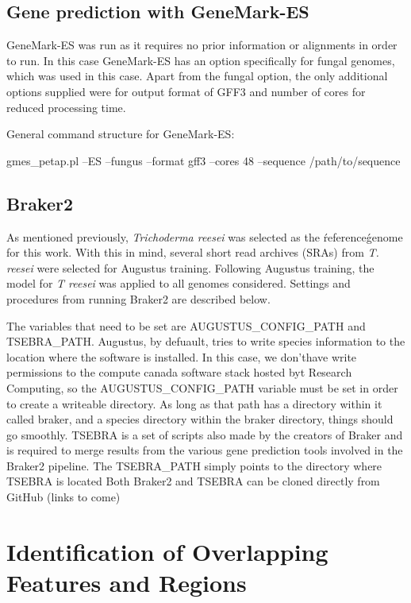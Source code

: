 \subsection{Gene prediction with GeneMark-ES}

GeneMark-ES was run as it requires no prior information or alignments
in order to run. In this case GeneMark-ES has an option specifically
for fungal genomes, which was used in this case. Apart from the fungal
option, the only additional options supplied were for output format of
GFF3 and number of cores for reduced processing time.

General command structure for GeneMark-ES:

gmes\_petap.pl --ES --fungus
--format gff3 --cores 48 --sequence /path/to/sequence

\subsection{Braker2}

As mentioned previously, \textit{Trichoderma reesei} was selected as
the \'reference\' genome for this work. With this in mind, several
short read archives (SRAs) from \textit{T. reesei} were selected for
Augustus training. Following Augustus training, the model for
\textit{T reesei} was applied to all genomes considered. Settings and
procedures from running Braker2 are described below.

The variables that need to be set are AUGUSTUS\_CONFIG\_PATH and
TSEBRA\_PATH. Augustus, by defuault, tries to write species
information to the location where the software is installed. In this
case, we don'thave write permissions to the compute canada software
stack hosted byt Research Computing, so the AUGUSTUS\_CONFIG\_PATH
variable must be set in order to create a writeable directory. As long
as that path has a directory within it called braker, and a species
directory within the braker directory, things should go
smoothly. TSEBRA is a set of scripts also made by the creators of
Braker and is required to merge results from the various gene
prediction tools involved in the Braker2 pipeline. The TSEBRA\_PATH
simply points to the directory where TSEBRA is located Both Braker2
and TSEBRA can be cloned directly from GitHub (links to come)

\section{Identification of Overlapping Features and Regions}

